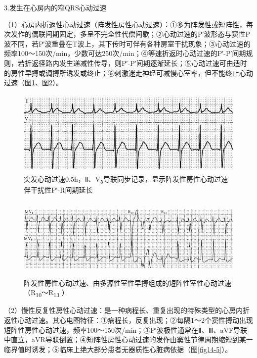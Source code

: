 3.发生在心房内的窄QRS心动过速

（1）心房内折返性心动过速（阵发性房性心动过速）：①多为阵发性或短阵性，每次发作的偶联间期固定，多呈不完全性代偿间歇；②心动过速的P′波形态与窦性P波不同，若P′波重叠在T波上，其下传时可伴有各种房室干扰现象；③心动过速的频率100～150次/min，少数可达250次/min；④等速折返时心动过速的P′-P′间期规则，若折返径路内发生递减性传导，则P′-P′间期逐渐延长；⑤心动过速可由适时的房性早搏或调搏所诱发或终止；⑥刺激迷走神经可减慢心室率，但不能终止心动过速（图\ref{fig32-3}、图\ref{fig32-4}）。

\begin{figure}[!htbp]
 \centering
 \includegraphics[width=4.79167in,height=1.63542in]{./images/Image00519.jpg}
 \captionsetup{justification=centering}
 \caption{突发心动过速0.5h，Ⅱ、V\textsubscript{5}导联同步记录，显示阵发性房性心动过速伴干扰性P′-R间期延长}
 \label{fig32-3}
  \end{figure} 


\begin{figure}[!htbp]
 \centering
 \includegraphics[width=5.58333in,height=1.55208in]{./images/Image00520.jpg}
 \captionsetup{justification=centering}
 \caption{阵发性房性心动过速、由多源性室性早搏组成的短阵性室性心动过速（R\textsubscript{10}～R\textsubscript{13} ）}
 \label{fig32-4}
  \end{figure} 


（2）慢性反复性房性心动过速：是一种病程长、重复出现的特殊类型的心房内折返性心动过速。其心电图特征：①病程长，反复出现；②每隔1～2个窦性搏动出现短阵性房性心动过速，频率100～150次/min；③P′波极性通常在Ⅱ、Ⅲ、aVF导联中直立，aVR导联倒置；④短阵性房性心动过速的发作由窦性节律周期缩短到某一临界值时诱发；⑤临床上绝大部分患者无器质性心脏病依据（图\ref{fig14-5}）。

